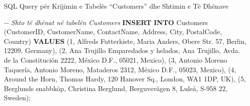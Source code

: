 \documentclass[
  ignorenonframetext,
]{beamer}
\newenvironment{Shaded}{\begin{snugshade}}{\end{snugshade}}
\newcommand{\CommentTok}[1]{\textcolor[rgb]{0.56,0.35,0.01}{\textit{#1}}}
\newcommand{\DecValTok}[1]{\textcolor[rgb]{0.00,0.00,0.81}{#1}}
\newcommand{\KeywordTok}[1]{\textcolor[rgb]{0.13,0.29,0.53}{\textbf{#1}}}
\newcommand{\NormalTok}[1]{#1}
\newcommand{\StringTok}[1]{\textcolor[rgb]{0.31,0.60,0.02}{#1}}
\begin{document}
\begin{frame}[fragile]{SQL Query për Krijimin e Tabelës ``Customers''
dhe Shtimin e Të Dhënave}
\label{sql-query-puxebr-krijimin-e-tabeluxebs-customers-dhe-shtimin-e-tuxeb-dhuxebnave-3}

\begin{Shaded}
\begin{Highlighting}[]
\CommentTok{{-}{-} Shto të dhënat në tabelën Customers}
\KeywordTok{INSERT} \KeywordTok{INTO}\NormalTok{ Customers (CustomerID, CustomerName, ContactName, Address, City, PostalCode, Country) }\KeywordTok{VALUES}
\NormalTok{(}\DecValTok{1}\NormalTok{, }\StringTok{\textquotesingle{}Alfreds Futterkiste\textquotesingle{}}\NormalTok{, }\StringTok{\textquotesingle{}Maria Anders\textquotesingle{}}\NormalTok{, }\StringTok{\textquotesingle{}Obere Str. 57\textquotesingle{}}\NormalTok{, }\StringTok{\textquotesingle{}Berlin\textquotesingle{}}\NormalTok{, }\StringTok{\textquotesingle{}12209\textquotesingle{}}\NormalTok{, }\StringTok{\textquotesingle{}Germany\textquotesingle{}}\NormalTok{),}
\NormalTok{(}\DecValTok{2}\NormalTok{, }\StringTok{\textquotesingle{}Ana Trujillo Emparedados y helados\textquotesingle{}}\NormalTok{, }\StringTok{\textquotesingle{}Ana Trujillo\textquotesingle{}}\NormalTok{, }\StringTok{\textquotesingle{}Avda. de la Constitución 2222\textquotesingle{}}\NormalTok{, }\StringTok{\textquotesingle{}México D.F.\textquotesingle{}}\NormalTok{, }\StringTok{\textquotesingle{}05021\textquotesingle{}}\NormalTok{, }\StringTok{\textquotesingle{}Mexico\textquotesingle{}}\NormalTok{),}
\NormalTok{(}\DecValTok{3}\NormalTok{, }\StringTok{\textquotesingle{}Antonio Moreno Taquería\textquotesingle{}}\NormalTok{, }\StringTok{\textquotesingle{}Antonio Moreno\textquotesingle{}}\NormalTok{, }\StringTok{\textquotesingle{}Mataderos 2312\textquotesingle{}}\NormalTok{, }\StringTok{\textquotesingle{}México D.F.\textquotesingle{}}\NormalTok{, }\StringTok{\textquotesingle{}05023\textquotesingle{}}\NormalTok{, }\StringTok{\textquotesingle{}Mexico\textquotesingle{}}\NormalTok{),}
\NormalTok{(}\DecValTok{4}\NormalTok{, }\StringTok{\textquotesingle{}Around the Horn\textquotesingle{}}\NormalTok{, }\StringTok{\textquotesingle{}Thomas Hardy\textquotesingle{}}\NormalTok{, }\StringTok{\textquotesingle{}120 Hanover Sq.\textquotesingle{}}\NormalTok{, }\StringTok{\textquotesingle{}London\textquotesingle{}}\NormalTok{, }\StringTok{\textquotesingle{}WA1 1DP\textquotesingle{}}\NormalTok{, }\StringTok{\textquotesingle{}UK\textquotesingle{}}\NormalTok{),}
\NormalTok{(}\DecValTok{5}\NormalTok{, }\StringTok{\textquotesingle{}Berglunds snabbköp\textquotesingle{}}\NormalTok{, }\StringTok{\textquotesingle{}Christina Berglund\textquotesingle{}}\NormalTok{, }\StringTok{\textquotesingle{}Berguvsvägen 8\textquotesingle{}}\NormalTok{, }\StringTok{\textquotesingle{}Luleå\textquotesingle{}}\NormalTok{, }\StringTok{\textquotesingle{}S{-}958 22\textquotesingle{}}\NormalTok{, }\StringTok{\textquotesingle{}Sweden\textquotesingle{}}\NormalTok{);}
\end{Highlighting}
\end{Shaded}
\end{frame}
\end{document}
